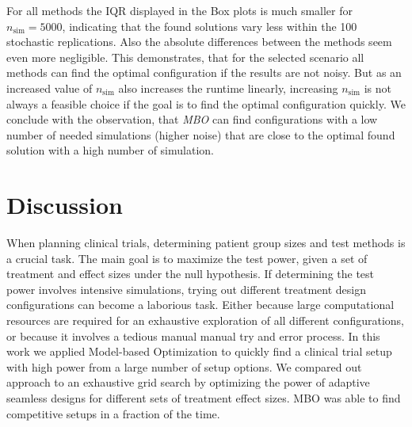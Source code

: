 \documentclass[bimj,fleqn]{w-art}
\theoremstyle{plain}
\theoremstyle{definition}
\begin{document}
For all methods the IQR displayed in the Box plots is much smaller for $n_\text{sim} = 5000$, indicating that the found solutions vary less within the 100 stochastic replications.
Also the absolute differences between the methods seem even more negligible.
This demonstrates, that for the selected scenario all methods can find the optimal configuration if the results are not noisy.
But as an increased value of $n_\text{sim}$ also increases the runtime linearly, increasing $n_\text{sim}$ is not always a feasible choice if the goal is to find the optimal configuration quickly.
We conclude with the observation, that \emph{MBO} can find configurations with a low number of needed simulations (higher noise) that are close to the optimal found solution with a high number of simulation.





\section{Discussion}
\label{sec:discussion}

When planning clinical trials, determining patient group sizes and test methods is a crucial task.
The main goal is to maximize the test power, given a set of treatment and effect sizes under the null hypothesis.
If determining the test power involves intensive simulations, trying out different treatment design configurations can become a laborious task.
Either because large computational resources are required for an exhaustive exploration of all different configurations, or because it involves a tedious manual manual try and error process.
In this work we applied Model-based Optimization to quickly find a clinical trial setup with high power from a large number of setup options.
We compared out approach to an exhaustive grid search by optimizing the power of adaptive seamless designs for different sets of treatment effect sizes.
MBO was able to find competitive setups in a fraction of the time.
\end{document}
